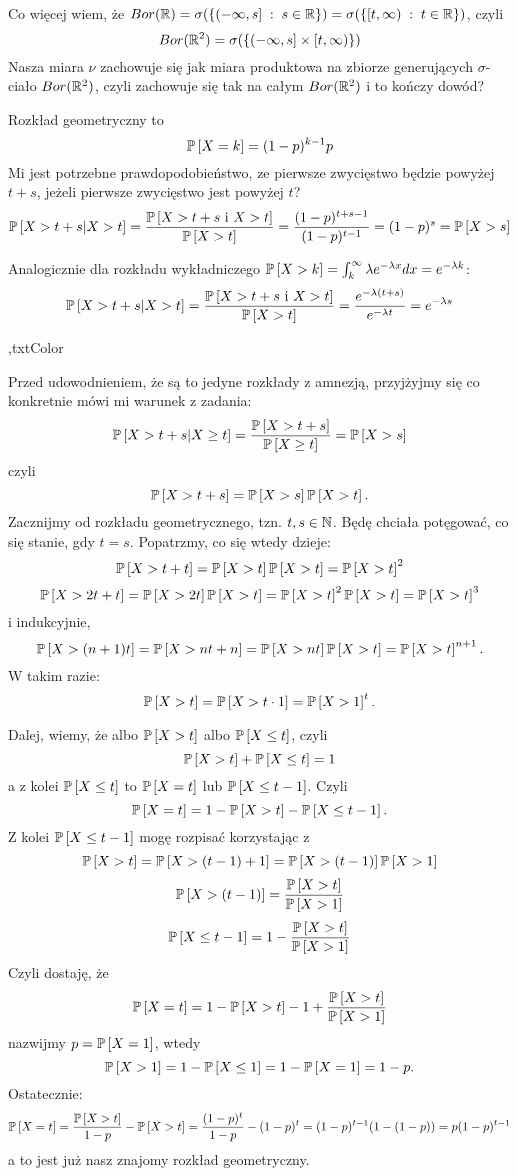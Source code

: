\documentclass{article}
\begin{document}
Co więcej wiem, że $Bor(\mathbb{R})=\sigma(\{(-\infty,s]\;:\;s\in\mathbb{R}\})=\sigma(\{[t,\infty)\;:\;t\in\mathbb{R}\})$, czyli
$$Bor(\mathbb{R}^2)=\sigma(\{(-\infty,s]\times[t,\infty)\})$$
Nasza miara $\nu$ zachowuje się jak miara produktowa na zbiorze generujących $\sigma$-ciało $Bor(\mathbb{R}^2)$, czyli zachowuje się tak na całym $Bor(\mathbb{R}^2)$ i to kończy dowód?


Rozkład geometryczny to
$$\prob{X=k}=(1-p)^{k-1}p$$
Mi jest potrzebne prawdopodobieństwo, ze pierwsze zwycięstwo będzie powyżej $t+s$, jeżeli pierwsze zwycięstwo jest powyżej $t$?
\begin{align*}
    \prob{X>t+s|X> t}=\frac{\prob{X>t+s\text{ i }X> t}}{\prob{X>t}}=\frac{(1-p)^{t+s-1}}{(1-p)^{t-1}}=(1-p)^{s}=\prob{X>s}
\end{align*}

Analogicznie dla rozkładu wykładniczego $\prob{X>k}=\int_k^\infty\lambda e^{-\lambda x}dx=e^{-\lambda k}$:
\begin{align*}
    \prob{X>t+s|X> t}=\frac{\prob{X>t+s\text{ i }X> t}}{\prob{X>t}}=\frac{e^{-\lambda(t+s)}}{ e^{-\lambda t}}=e^{-\lambda s}
\end{align*}

\sep{txtColor}

Przed udowodnieniem, że są to jedyne rozkłady z amnezją, przyjżyjmy się co konkretnie mówi mi warunek z zadania:
$$\prob{X>t+s|X\geq t}=\frac{\prob{X>t+s}}{\prob{X\geq t}}=\prob{X>s}$$
czyli
$$\prob{X>t+s}=\prob{X>s}\prob{X> t}.$$
Zacznijmy od rozkładu geometrycznego, tzn. $t,s\in\mathbb{N}$. Będę chciała potęgować, co się stanie, gdy $t=s$. Popatrzmy, co się wtedy dzieje:
$$\prob{X>t+t}=\prob{X>t}\prob{X> t}=\prob{X>t}^2$$
$$\prob{X>2t+t}=\prob{X>2t}\prob{X>t}=\prob{X>t}^2\prob{X>t}=\prob{X>t}^3$$
i indukcyjnie,
$$\prob{X>(n+1)t}=\prob{X>nt+n}=\prob{X>nt}\prob{X>t}=\prob{X>t}^{n+1}.$$
W takim razie:
$$\prob{X>t}=\prob{X>t\cdot1}=\prob{X>1}^t.$$

Dalej, wiemy, że albo $\prob{X>t}$ albo $\prob{X\leq t}$, czyli
$$\prob{X>t}+\prob{X\leq t}=1$$
a z kolei $\prob{X\leq t}$ to $\prob{X=t}$ lub $\prob{X\leq t-1}$. Czyli
$$\prob{X=t}=1-\prob{X>t}-\prob{X\leq t-1}.$$
Z kolei $\prob{X\leq t-1}$ mogę rozpisać korzystając z 
$$\prob{X>t}=\prob{X>(t-1)+1}=\prob{X>(t-1)}\prob{X>1}$$
$$\prob{X>(t-1)}=\frac{\prob{X>t}}{\prob{X>1}}$$
$$\prob{X\leq t-1}=1-\frac{\prob{X>t}}{\prob{X>1}}$$
Czyli dostaję, że
$$\prob{X=t}=1-\prob{X>t}-1+\frac{\prob{X>t}}{\prob{X>1}}$$
nazwijmy $p=\prob{X=1}$, wtedy 
$$\prob{X>1}=1-\prob{X\leq 1}=1-\prob{X=1}=1-p.$$
Ostatecznie:
$$\prob{X=t}=\frac{\prob{X>t}}{1-p}-\prob{X>t}=\frac{(1-p)^t}{1-p}-(1-p)^t=(1-p)^{t-1}(1-(1-p))=p(1-p)^{t-1}$$
a to jest już nasz znajomy rozkład geometryczny.
\medskip
\end{document}
